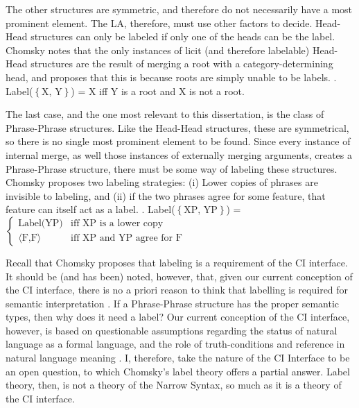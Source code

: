 \documentclass[letterpaper,12pt]{article}
\newcommand{\hh}{$\left\{ \text{X, Y} \right\}$}
\newcommand{\xpyp}{$\left\{ \text{XP, YP} \right\}$}
\begin{document}
The other structures are symmetric, and therefore do not necessarily have a most prominent element.
The LA, therefore, must use other factors to decide.
Head-Head structures can only be labeled if only one of the heads can be the label.
Chomsky notes that the only instances of licit (and therefore labelable) Head-Head structures are the result of merging a root with a category-determining head, and proposes that this is because roots are simply unable to be labels.
\ex.\label{ex:hh_rule} Label(\hh) = X iff Y is a root and X is not a root.

The last case, and the one most relevant to this dissertation, is the class of Phrase-Phrase structures.
Like the Head-Head structures, these are symmetrical, so there is no single most prominent element to be found.
Since every instance of internal merge, as well those instances of externally merging arguments, creates a Phrase-Phrase structure, there must be some way of labeling these structures.
Chomsky proposes two labeling strategies: (i) Lower copies of phrases are invisible to labeling, and (ii) if the two phrases agree for some feature, that feature can itself act as a label.
\ex.\label{ex:xpyp_rule} Label(\xpyp) = $
\begin{cases}
  \text{Label(YP)} & \text{iff XP is a lower copy}\\
  \langle\text{F,F}\rangle & \text{iff XP and YP agree for F}
\end{cases}
$

Recall that Chomsky proposes that labeling is a requirement of the CI interface.
It should be (and has been) noted, however, that, given our current conception of the CI interface, there is no a priori reason to think that labelling is required for semantic interpretation \parencite[see \textit{e.g.,}][]{hornstein2016arizona}.
If a Phrase-Phrase structure has the proper semantic types, then why does it need a label?
Our current conception of the CI interface, however, is based on questionable assumptions regarding the status of natural language as a formal language, and the role of truth-conditions and reference in natural language meaning \parencite{chomsky2000new,pietroski2005events,moravcsik1998meaning}.
I, therefore, take the nature of the CI Interface to be an open question, to which Chomsky's label theory offers a partial answer.
Label theory, then, is not a theory of the Narrow Syntax, so much as it is a theory of the CI interface.
\end{document}
